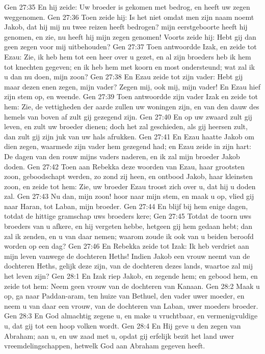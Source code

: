 Gen 27:35  En hij zeide: Uw broeder is gekomen met bedrog, en heeft uw zegen weggenomen.
Gen 27:36  Toen zeide hij: Is het niet omdat men zijn naam noemt Jakob, dat hij mij nu twee reizen heeft bedrogen? mijn eerstgeboorte heeft hij genomen, en zie, nu heeft hij mijn zegen genomen! Voorts zeide hij: Hebt gij dan geen zegen voor mij uitbehouden?
Gen 27:37  Toen antwoordde Izak, en zeide tot Ezau: Zie, ik heb hem tot een heer over u gezet, en al zijn broeders heb ik hem tot knechten gegeven; en ik heb hem met koorn en most ondersteund; wat zal ik u dan nu doen, mijn zoon?
Gen 27:38  En Ezau zeide tot zijn vader: Hebt gij maar dezen enen zegen, mijn vader? Zegen mij, ook mij, mijn vader! En Ezau hief zijn stem op, en weende.
Gen 27:39  Toen antwoordde zijn vader Izak en zeide tot hem: Zie, de vettigheden der aarde zullen uw woningen zijn, en van den dauw des hemels van boven af zult gij gezegend zijn.
Gen 27:40  En op uw zwaard zult gij leven, en zult uw broeder dienen; doch het zal geschieden, als gij heersen zult, dan zult gij zijn juk van uw hals afrukken.
Gen 27:41  En Ezau haatte Jakob om dien zegen, waarmede zijn vader hem gezegend had; en Ezau zeide in zijn hart: De dagen van den rouw mijns vaders naderen, en ik zal mijn broeder Jakob doden.
Gen 27:42  Toen aan Rebekka deze woorden van Ezau, haar grootsten zoon, geboodschapt werden, zo zond zij heen, en ontbood Jakob, haar kleinsten zoon, en zeide tot hem: Zie, uw broeder Ezau troost zich over u, dat hij u doden zal.
Gen 27:43  Nu dan, mijn zoon! hoor naar mijn stem, en maak u op, vlied gij naar Haran, tot Laban, mijn broeder.
Gen 27:44  En blijf bij hem enige dagen, totdat de hittige gramschap uws broeders kere;
Gen 27:45  Totdat de toorn uws broeders van u afkere, en hij vergeten hebbe, hetgeen gij hem gedaan hebt; dan zal ik zenden, en u van daar nemen; waarom zoude ik ook van u beiden beroofd worden op een dag?
Gen 27:46  En Rebekka zeide tot Izak: Ik heb verdriet aan mijn leven vanwege de dochteren Heths! Indien Jakob een vrouw neemt van de dochteren Heths, gelijk deze zijn, van de dochteren dezes lands, waartoe zal mij het leven zijn?
Gen 28:1  En Izak riep Jakob, en zegende hem; en gebood hem, en zeide tot hem: Neem geen vrouw van de dochteren van Kanaan.
Gen 28:2  Maak u op, ga naar Paddan-aram, ten huize van Bethuel, den vader uwer moeder, en neem u van daar een vrouw, van de dochteren van Laban, uwer moeders broeder.
Gen 28:3  En God almachtig zegene u, en make u vruchtbaar, en vermenigvuldige u, dat gij tot een hoop volken wordt.
Gen 28:4  En Hij geve u den zegen van Abraham; aan u, en uw zaad met u, opdat gij erfelijk bezit het land uwer vreemdelingschappen, hetwelk God aan Abraham gegeven heeft.
